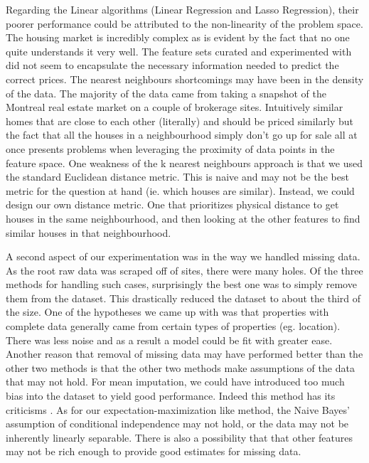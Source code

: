 \documentclass{acm_proc_article-sp}
\begin{document}
	Regarding the Linear algorithms (Linear Regression and Lasso Regression), their poorer performance could be attributed to the non-linearity of the problem space. The housing market is incredibly complex as is evident by the fact that no one quite understands it very well. The feature sets curated and experimented with did not seem to encapsulate the necessary information needed to predict the correct prices. The nearest neighbours shortcomings may have been in the density of the data. The majority of the data came from taking a snapshot of the Montreal real estate market on a couple of brokerage sites. Intuitively similar homes that are close to each other (literally) and should be priced similarly but the fact that all the houses in a neighbourhood simply don't go up for sale all at once presents problems when leveraging the proximity of data points in the feature space. One weakness of the k nearest neighbours approach is that we used the standard Euclidean distance metric. This is naive and may not be the best metric for the question at hand (ie. which houses are similar). Instead, we could design our own distance metric. One that prioritizes physical distance to get houses in the same neighbourhood, and then looking at the other features to find similar houses in that neighbourhood.
	
	A second aspect of our experimentation was in the way we handled missing data. As the root raw data was scraped off of sites, there were many holes. Of the three methods for handling such cases, surprisingly the best one was to simply remove them from the dataset. This drastically reduced the dataset to about the third of the size. One of the hypotheses we came up with was that properties with complete data generally came from certain types of properties (eg. location). There was less noise and as a result a model could be fit with greater ease. Another reason that removal of missing data may have performed better than the other two methods is that the other two methods make assumptions of the data that may not hold. For mean imputation, we could have introduced too much bias into the dataset to yield good performance. Indeed this method has its criticisms \cite{meancrit}. As for our expectation-maximization like method, the Naive Bayes' assumption of conditional independence may not hold, or the data may not be inherently linearly separable. There is also a possibility that that other features may not be rich enough to provide good estimates for missing data.
	
\end{document}
